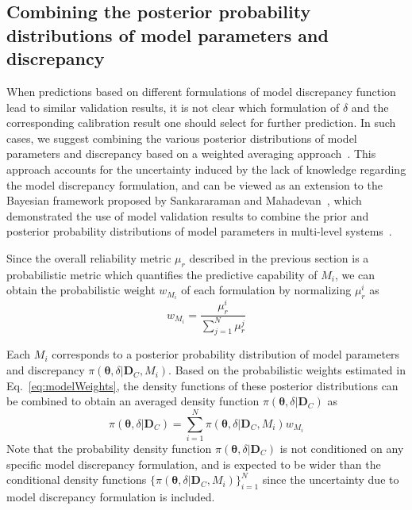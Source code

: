 \documentclass[preprint,review,12pt,3p]{elsarticle}
\begin{document}
\subsection{Combining the posterior probability distributions of model parameters and discrepancy}\label{section:combinationStep}
When predictions based on different formulations of model discrepancy function lead to similar validation results, it is not clear which formulation of $\delta$ and the corresponding calibration result one should select for further prediction. In such cases, we suggest combining the various posterior distributions of model parameters and discrepancy based on a weighted averaging approach~\citep{Hoeting1999}. This approach accounts for the uncertainty induced by the lack of knowledge regarding the model discrepancy formulation, and can be viewed as an extension to the Bayesian framework proposed by Sankararaman and Mahadevan~\citep{Sankararaman2012c}, which demonstrated the use of model validation results to combine the prior and posterior probability distributions of model parameters in multi-level systems~\citep{Sankararaman2012,Mullins2013}.

Since the overall reliability metric $\mu_r$ described in the previous section is a probabilistic metric which quantifies the predictive capability of $M_i$, we can obtain the probabilistic weight $w_{M_i}$ of each formulation by normalizing $\mu_r^i$ as
\begin{equation}\label{eq:modelWeights}
w_{M_i}=\frac{\mu_r^i}{\sum_{j=1}^N \mu_r^j}
\end{equation}

Each $M_i$ corresponds to a posterior probability distribution of model parameters and discrepancy $\pi(\boldsymbol{\theta},\delta|\boldsymbol{D}_C,M_i)$. Based on the probabilistic weights estimated in Eq.~\ref{eq:modelWeights}, the density functions of these posterior distributions can be combined to obtain an averaged density function $\pi(\boldsymbol{\theta},\delta|\boldsymbol{D}_C)$ as
\begin{equation}\label{eq:combinePDF}
\pi(\boldsymbol{\theta},\delta | \boldsymbol{D}_C)=\sum_{i=1}^N \pi(\boldsymbol{\theta},\delta|\boldsymbol{D}_C,M_i) w_{M_i}
\end{equation}
Note that the probability density function $\pi(\boldsymbol{\theta},\delta|\boldsymbol{D}_C)$ is not conditioned on any specific model discrepancy formulation, and is expected to be wider than the conditional density functions $\{\pi(\boldsymbol{\theta},\delta|\boldsymbol{D}_C,M_i)\}_{i=1}^N$ since the uncertainty due to model discrepancy formulation is included.
\end{document}
